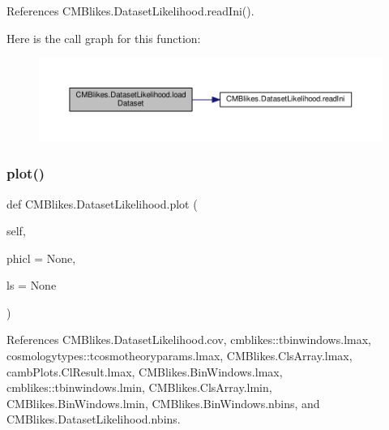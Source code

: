 References C\+M\+Blikes.\+Dataset\+Likelihood.\+read\+Ini().

Here is the call graph for this function\+:
\nopagebreak
\begin{figure}[H]
\begin{center}
\leavevmode
\includegraphics[width=350pt]{classCMBlikes_1_1DatasetLikelihood_a937aff0ad89355d32c9d5fe9bda150f8_cgraph}
\end{center}
\end{figure}
\mbox{\label{classCMBlikes_1_1DatasetLikelihood_a66d6d09de55272b7cfdad9c4715f196a}} 
\subsubsection{\texorpdfstring{plot()}{plot()}}
{\footnotesize\ttfamily def C\+M\+Blikes.\+Dataset\+Likelihood.\+plot (\begin{DoxyParamCaption}\item[{}]{self,  }\item[{}]{phicl = {\ttfamily None},  }\item[{}]{ls = {\ttfamily None} }\end{DoxyParamCaption})}



References C\+M\+Blikes.\+Dataset\+Likelihood.\+cov, cmblikes\+::tbinwindows.\+lmax, cosmologytypes\+::tcosmotheoryparams.\+lmax, C\+M\+Blikes.\+Cls\+Array.\+lmax, camb\+Plots.\+Cl\+Result.\+lmax, C\+M\+Blikes.\+Bin\+Windows.\+lmax, cmblikes\+::tbinwindows.\+lmin, C\+M\+Blikes.\+Cls\+Array.\+lmin, C\+M\+Blikes.\+Bin\+Windows.\+lmin, C\+M\+Blikes.\+Bin\+Windows.\+nbins, and C\+M\+Blikes.\+Dataset\+Likelihood.\+nbins.

\mbox{\label{classCMBlikes_1_1DatasetLikelihood_a0be6ad34af94442ef5f81038b4691a40}} 
